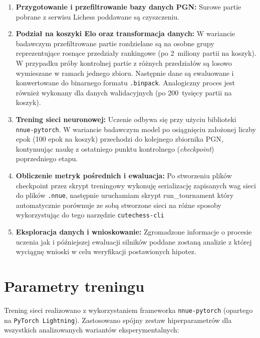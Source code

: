 \documentclass[12pt,a4paper]{report}
\begin{document}
\begin{enumerate}
    \item \textbf{Przygotowanie i przefiltrowanie bazy danych PGN:} Surowe partie pobrane z serwisu Lichess poddawane są czyszczeniu.
    \item \textbf{Podział na koszyki Elo oraz transformacja danych:} W wariancie badawczym przefiltrowane partie rozdzielane są na osobne grupy reprezentujące rosnące przedziały rankingowe (po 2~miliony partii na koszyk). W przypadku próby kontrolnej partie z różnych przedziałów są losowo wymieszane w ramach jednego zbioru. Następnie dane są ewaluowane i konwertowane do binarnego formatu \texttt{.binpack}. Analogiczny proces jest również wykonany dla danych walidacyjnych (po 200~tysięcy partii na koszyk).
    \item \textbf{Trening sieci neuronowej:} Uczenie odbywa się przy użyciu biblioteki \texttt{nnue-pytorch}. W wariancie badawczym model po osiągnięciu założonej liczby epok (100 epok na koszyk) przechodzi do kolejnego zbiornika PGN, kontynuując naukę z ostatniego punktu kontrolnego (\textit{checkpoint}) poprzedniego etapu.
    \item \textbf{Obliczenie metryk pośrednich i ewaluacja:} Po stworzeniu plików checkpoint przez skrypt treningowy wykonuję serializację zapisanych wag sieci do plików \texttt{.nnue}, następnie uruchamiam skrypt run\_tournament który automatycznie porównuje ze sobą stworzone sieci na różne sposoby wykorzystując do tego narzędzie \texttt{cutechess-cli}
    \item \textbf{Eksploracja danych i wnioskowanie:} Zgromadzone informacje o procesie uczenia jak i późniejszej ewaluacji silników poddane zostaną analizie z której wyciągnę wnioski w celu weryfikacji postawionych hipotez.
\end{enumerate}

\section{Parametry treningu}

Trening sieci realizowano z wykorzystaniem frameworka \texttt{nnue-pytorch} (opartego na \texttt{PyTorch Lightning}). Zastosowano spójny zestaw hiperparametrów dla wszystkich analizowanych wariantów eksperymentalnych:
\end{document}
